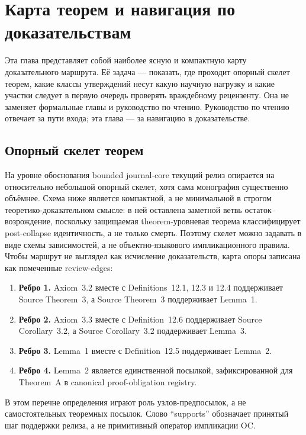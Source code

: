 \section{Карта теорем и навигация по доказательствам}
\label{sec:oc13-theorem-roadmap}

Эта глава представляет собой наиболее ясную и компактную карту доказательного маршрута. Её задача — показать, где проходит опорный скелет теорем, какие классы утверждений несут какую научную нагрузку и какие участки следует в первую очередь проверять враждебному рецензенту. Она не заменяет формальные главы и руководство по чтению. Руководство по чтению отвечает за пути входа; эта глава — за навигацию в доказательстве.

\subsection{Опорный скелет теорем}

На уровне обоснования bounded journal-core текущий релиз опирается на относительно небольшой опорный скелет, хотя сама монография существенно объёмнее. Схема ниже является компактной, а не минимальной в строгом теоретико-доказательном смысле: в ней оставлена заметной ветвь остаток--возрождение, поскольку защищаемая theorem-уровневая теорема классифицирует post-collapse идентичность, а не только смерть. Поэтому скелет можно задавать в виде схемы зависимостей, а не объектно-языкового импликационного правила. Чтобы маршрут не выглядел как исчисление доказательств, карта опоры записана как помеченные review-edges:

\begin{enumerate}
\item \textbf{Ребро 1.} Axiom~3.2 вместе с Definitions~12.1, 12.3 и 12.4 поддерживает Source Theorem~3, а Source Theorem~3 поддерживает Lemma~1.
\item \textbf{Ребро 2.} Axiom~3.3 вместе с Definition~12.6 поддерживает Source Corollary~3.2, а Source Corollary~3.2 поддерживает Lemma~3.
\item \textbf{Ребро 3.} Lemma~1 вместе с Definition~12.5 поддерживает Lemma~2.
\item \textbf{Ребро 4.} Lemma~2 является единственной посылкой, зафиксированной для Theorem~A в canonical proof-obligation registry.
\end{enumerate}

В этом перечне определения играют роль узлов-предпосылок, а не самостоятельных теоремных посылок. Слово ``supports'' обозначает принятый шаг поддержки релиза, а не примитивный оператор импликации OC.

